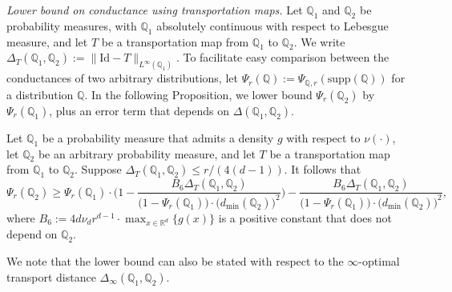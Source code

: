 \documentclass[twoside,11pt]{article}
\newcommand{\Reals}{\mathbb{R}}
\newcommand{\1}{\mathbf{1}}
\newcommand{\Rd}{\Reals^d}
\newcommand{\Leb}{L}
\newcommand{\mbb}[1]{\mathbb{#1}}
\begin{document}
\noindent \emph{Lower bound on conductance using transportation maps.}
Let $\mbb{Q}_1$ and $\mbb{Q}_2$ be probability measures, with $\mbb{Q}_1$ absolutely continuous with respect to Lebesgue measure, and let $T$ be a transportation map from $\mbb{Q}_1$ to $\mbb{Q}_2$. We write $\Delta_T(\mbb{Q}_1,\mbb{Q}_2) := \|\mathrm{Id} - T\|_{\Leb^{\infty}(\mbb{Q}_1)}$. To facilitate easy comparison between the conductances of two arbitrary distributions, let $\Psi_r(\mbb{Q}) := \Psi_{\mbb{Q},r}(\mathrm{supp}(\mbb{Q}))$ for a distribution $\mbb{Q}$. In the following Proposition, we lower bound $\Psi_r(\mbb{Q}_2)$ by $\Psi_r(\mbb{Q}_1)$, plus an error term that depends on $\Delta(\mbb{Q}_1,\mbb{Q}_2)$.
\begin{proposition}
	\label{prop:conductance_lb_transportation_distance}
	Let $\mbb{Q}_1$ be a probability measure that admits a density $g$ with respect to $\nu(\cdot)$, let $\mbb{Q}_2$ be an arbitrary probability measure, and let $T$ be a transportation map from $\mbb{Q}_1$ to $\mbb{Q}_2$. Suppose $\Delta_T(\mbb{Q}_1,\mbb{Q}_2) \leq r/(4(d - 1))$. It follows that
	\begin{equation}
	\label{eqn:conductance_lb_transportation_distance}
	\Psi_r(\mbb{Q}_2) \geq \Psi_r(\mbb{Q}_1) \cdot \biggl(1 - \frac{B_6\Delta_T(\mbb{Q}_1,\mbb{Q}_2)}{\bigl(1 - \Psi_r(\mbb{Q}_1)\bigr) \cdot \bigl(d_{\min}(\mbb{Q}_2)\bigr)^2}\biggr) - \frac{B_6 \Delta_T(\mbb{Q}_1,\mbb{Q}_2)}{\bigl(1 - \Psi_r(\mbb{Q}_1)\bigr) \cdot \bigl(d_{\min}(\mbb{Q}_2)\bigr)^2},
	\end{equation}
	where $B_6 := 4d \nu_d r^{d - 1} \cdot \max_{x \in \Rd}\{g(x)\}$ is a positive constant that does not depend on $\mbb{Q}_2$. 
\end{proposition}
We note that the lower bound can also be stated with respect to the $\infty$-optimal transport distance $\Delta_{\infty}(\mbb{Q}_1,\mbb{Q}_2)$.\\
\end{document}
